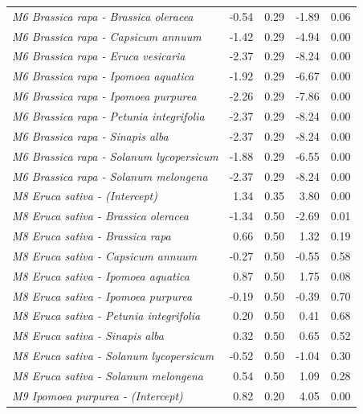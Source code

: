 \documentclass[12pt,]{article}
\begin{document}
\begin{longtable}[t]{>{\em}lrrrr}
\addlinespace
M6 Brassica rapa - Brassica oleracea & -0.54 & 0.29 & -1.89 & 0.06\\
\addlinespace
\rowcolor{gray!6}  M6 Brassica rapa - Capsicum annuum & -1.42 & 0.29 & -4.94 & 0.00\\
\addlinespace
M6 Brassica rapa - Eruca vesicaria & -2.37 & 0.29 & -8.24 & 0.00\\
\addlinespace
\rowcolor{gray!6}  M6 Brassica rapa - Ipomoea aquatica & -1.92 & 0.29 & -6.67 & 0.00\\
\addlinespace
M6 Brassica rapa - Ipomoea purpurea & -2.26 & 0.29 & -7.86 & 0.00\\
\addlinespace
\rowcolor{gray!6}  M6 Brassica rapa - Petunia integrifolia & -2.37 & 0.29 & -8.24 & 0.00\\
\addlinespace
M6 Brassica rapa - Sinapis alba & -2.37 & 0.29 & -8.24 & 0.00\\
\addlinespace
\rowcolor{gray!6}  M6 Brassica rapa - Solanum lycopersicum & -1.88 & 0.29 & -6.55 & 0.00\\
\addlinespace
M6 Brassica rapa - Solanum melongena & -2.37 & 0.29 & -8.24 & 0.00\\
\addlinespace
\rowcolor{gray!6}  M8 Eruca sativa - (Intercept) & 1.34 & 0.35 & 3.80 & 0.00\\
\addlinespace
M8 Eruca sativa - Brassica oleracea & -1.34 & 0.50 & -2.69 & 0.01\\
\addlinespace
\rowcolor{gray!6}  M8 Eruca sativa - Brassica rapa & 0.66 & 0.50 & 1.32 & 0.19\\
\addlinespace
M8 Eruca sativa - Capsicum annuum & -0.27 & 0.50 & -0.55 & 0.58\\
\addlinespace
\rowcolor{gray!6}  M8 Eruca sativa - Ipomoea aquatica & 0.87 & 0.50 & 1.75 & 0.08\\
\addlinespace
M8 Eruca sativa - Ipomoea purpurea & -0.19 & 0.50 & -0.39 & 0.70\\
\addlinespace
\rowcolor{gray!6}  M8 Eruca sativa - Petunia integrifolia & 0.20 & 0.50 & 0.41 & 0.68\\
\addlinespace
M8 Eruca sativa - Sinapis alba & 0.32 & 0.50 & 0.65 & 0.52\\
\addlinespace
\rowcolor{gray!6}  M8 Eruca sativa - Solanum lycopersicum & -0.52 & 0.50 & -1.04 & 0.30\\
\addlinespace
M8 Eruca sativa - Solanum melongena & 0.54 & 0.50 & 1.09 & 0.28\\
\addlinespace
\rowcolor{gray!6}  M9 Ipomoea purpurea - (Intercept) & 0.82 & 0.20 & 4.05 & 0.00\\

\end{longtable}
\end{document}
